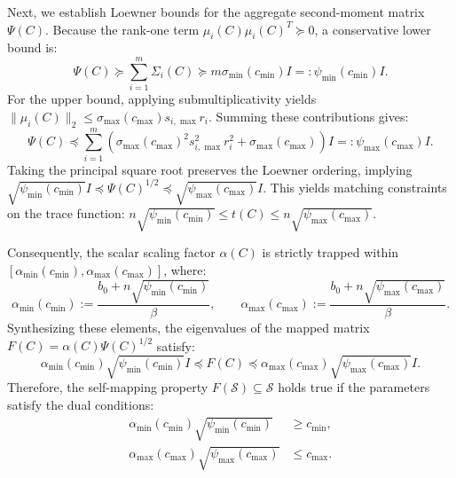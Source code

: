 \documentclass[11pt]{article}
\begin{document}
Next, we establish Loewner bounds for the aggregate second-moment matrix $\Psi(C)$. Because the rank-one term $\mu_i(C)\mu_i(C)^T \succeq 0$, a conservative lower bound is:
\begin{equation}
\Psi(C) \succeq \sum_{i=1}^m \Sigma_i(C) \succeq m \sigma_{\min}(c_{\min})I =: \psi_{\min}(c_{\min})I.
\end{equation}
For the upper bound, applying submultiplicativity yields $\|\mu_i(C)\|_2 \le \sigma_{\max}(c_{\max}) s_{i,\max} r_i$. Summing these contributions gives:
\begin{equation}
\Psi(C) \preceq \sum_{i=1}^m \left( \sigma_{\max}(c_{\max})^2 s_{i,\max}^2 r_i^2 + \sigma_{\max}(c_{\max}) \right)I =: \psi_{\max}(c_{\max})I.
\end{equation}
Taking the principal square root preserves the Loewner ordering, implying $\sqrt{\psi_{\min}(c_{\min})}I \preceq \Psi(C)^{1/2} \preceq \sqrt{\psi_{\max}(c_{\max})}I$. This yields matching constraints on the trace function: $n\sqrt{\psi_{\min}(c_{\min})} \le t(C) \le n\sqrt{\psi_{\max}(c_{\max})}$.

Consequently, the scalar scaling factor $\alpha(C)$ is strictly trapped within $[\alpha_{\min}(c_{\min}), \alpha_{\max}(c_{\max})]$, where:
\begin{equation}
\alpha_{\min}(c_{\min}) := \frac{b_0 + n\sqrt{\psi_{\min}(c_{\min})}}{\beta}, \qquad \alpha_{\max}(c_{\max}) := \frac{b_0 + n\sqrt{\psi_{\max}(c_{\max})}}{\beta}.
\end{equation}
Synthesizing these elements, the eigenvalues of the mapped matrix $F(C) = \alpha(C)\Psi(C)^{1/2}$ satisfy:
\begin{equation}
\alpha_{\min}(c_{\min})\sqrt{\psi_{\min}(c_{\min})}I \preceq F(C) \preceq \alpha_{\max}(c_{\max})\sqrt{\psi_{\max}(c_{\max})}I.
\end{equation}
Therefore, the self-mapping property $F(\mathcal{S}) \subseteq \mathcal{S}$ holds true if the parameters satisfy the dual conditions:
\begin{align}\label{eq:self-mapping-conds}
\alpha_{\min}(c_{\min})\sqrt{\psi_{\min}(c_{\min})} &\ge c_{\min}, \\
\alpha_{\max}(c_{\max})\sqrt{\psi_{\max}(c_{\max})} &\le c_{\max}.
\end{align}
\end{document}
